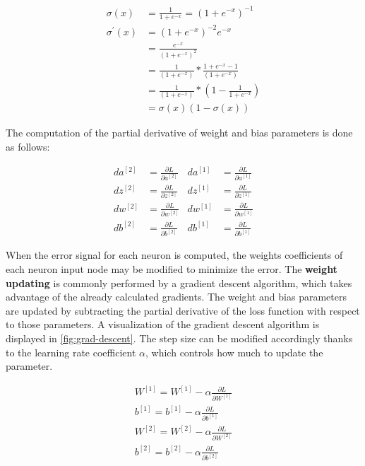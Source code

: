 \begin{equation}
\begin{aligned}
\sigma(x) &=\frac{1}{1+e^{-x}}=\left(1+e^{-x}\right)^{-1} \\
\sigma^{\prime}(x) &=\left(1+e^{-x}\right)^{-2} e^{-x} \\
&=\frac{e^{-x}}{\left(1+e^{-x}\right)^{2}} \\
&=\frac{1}{\left(1+e^{-x}\right)} * \frac{1+e^{-x}-1}{\left(1+e^{-x}\right)} \\
&=\frac{1}{\left(1+e^{-x}\right)} *\left(1-\frac{1}{1+e^{-x}}\right) \\
&=\sigma(x)(1-\sigma(x))
\end{aligned}
\end{equation}

\noindent The computation of the partial derivative of weight and bias parameters is done as follows:

\begin{align}
d a^{[2]}&=\frac{\partial L}{\partial a^{[2]}} & d a^{[1]}&=\frac{\partial L}{\partial a^{[1]}} \nonumber\\
d z^{[2]}&=\frac{\partial L}{\partial z^{[2]}} & d z^{[1]}&=\frac{\partial L}{\partial z^{[1]}} \nonumber\\
d w^{[2]}&=\frac{\partial L}{\partial w^{[2]}} & d w^{[1]}&=\frac{\partial L}{\partial w^{[1]}} \nonumber\\
d b^{[2]}&=\frac{\partial L}{\partial b^{[2]}} & d b^{[1]}&=\frac{\partial L}{\partial b^{[1]}} 
\end{align}

\noindent When the error signal for each neuron is computed, the weights coefficients of each neuron input node may be modified to minimize the error.
The \textbf{weight updating} is commonly performed by a gradient descent algorithm, which takes advantage of the already calculated gradients.
The weight and bias parameters are updated by subtracting the partial derivative of the loss function with respect to those parameters.
A visualization of the gradient descent algorithm is displayed in \autoref{fig:grad-descent}.
The step size can be modified accordingly thanks to the learning rate coefficient $\alpha$, which controls how much to update the parameter.

\begin{equation}
\begin{aligned}
W^{[1]}=W^{[1]}-\alpha \frac{\partial L}{\partial W^{[1]}}\\
b^{[1]}=b^{[1]}-\alpha \frac{\partial L}{\partial b^{[1]}}\\
W^{[2]}=W^{[2]}-\alpha \frac{\partial L}{\partial W^{[2]}}\\
b^{[2]}=b^{[2]}-\alpha \frac{\partial L}{\partial b^{[2]}}
\end{aligned}
\end{equation}

